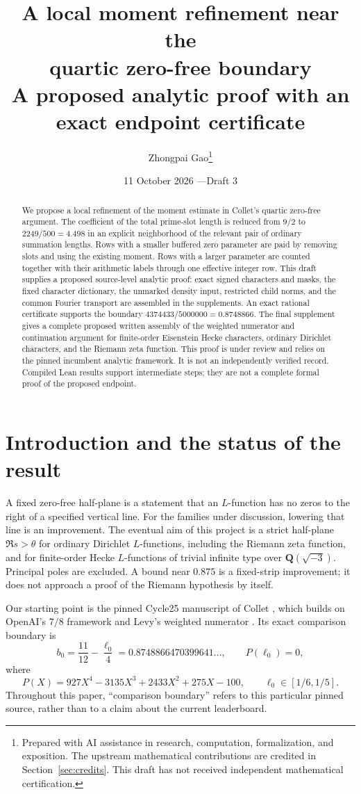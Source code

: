 \documentclass[11pt]{article}
\title{A local moment refinement near the\protect\\quartic zero-free boundary\\[6pt]
\large A proposed analytic proof with an exact endpoint certificate}
\author{Zhongpai Gao\thanks{Prepared with AI assistance in research, computation, formalization, and exposition. The upstream mathematical contributions are credited in Section~\ref{sec:credits}. This draft has not received independent mathematical certification.}}
\date{11 October 2026 \quad---\quad Draft 3}
\theoremstyle{definition}
\newcommand{\Q}{\mathbf Q}
\begin{document}
\maketitle
\begin{abstract}
We propose a local refinement of the moment estimate in Collet's quartic
zero-free argument. The coefficient of the total prime-slot length is
reduced from $9/2$ to $2249/500=4.498$ in an explicit neighborhood of the
relevant pair of ordinary summation lengths. Rows with a smaller buffered
zero parameter are paid by removing slots and using the existing moment.
Rows with a larger parameter are counted together with their arithmetic
labels through one effective integer row. This draft supplies a proposed
source-level analytic proof: exact signed characters and masks, the fixed
character dictionary, the unmarked density input, restricted child norms,
and the common Fourier transport are assembled in the supplements.
An exact rational certificate supports the boundary
$4374433/5000000=0.8748866$. The final supplement gives a complete proposed
written assembly of the weighted numerator and continuation argument for
finite-order Eisenstein Hecke characters, ordinary Dirichlet characters,
and the Riemann zeta function. This proof is under review and relies on
the pinned incumbent analytic framework. It is not an independently
verified record. Compiled Lean results support intermediate steps;
they are not a complete formal proof of the proposed endpoint.
\end{abstract}
\clearpage
\tableofcontents
\clearpage

\section{Introduction and the status of the result}

A fixed zero-free half-plane is a statement that an $L$-function has no
zeros to the right of a specified vertical line. For the families under
discussion, lowering that line is an improvement. The eventual aim of
this project is a strict half-plane $\Re s>\theta$ for ordinary Dirichlet
$L$-functions, including the Riemann zeta function, and for finite-order
Hecke $L$-functions of trivial infinite type over $\Q(\sqrt{-3})$.
Principal poles are excluded. A bound near $0.875$ is a fixed-strip
improvement; it does not approach a proof of the Riemann hypothesis by
itself.

Our starting point is the pinned Cycle25 manuscript of Collet
\cite{collet}, which builds on OpenAI's $7/8$ framework \cite{openai}
and Levy's weighted numerator \cite{levy}. Its exact comparison boundary is
\begin{equation}\label{eq:quartic}
 b_0=\frac{11}{12}-\frac{\ell_0}{4}
     =0.8748866470399641\ldots,
 \qquad
 P(\ell_0)=0,
\end{equation}
where
\[
 P(X)=927X^4-3135X^3+2433X^2+275X-100,
 \qquad \ell_0\in[1/6,1/5].
\]
Throughout this paper, ``comparison boundary'' refers to this particular
pinned source, rather than to a claim about the current leaderboard.
\end{document}

